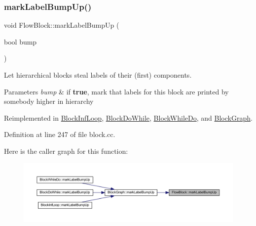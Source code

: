 \subsubsection{\texorpdfstring{markLabelBumpUp()}{markLabelBumpUp()}}
{\footnotesize\ttfamily void Flow\+Block\+::mark\+Label\+Bump\+Up (\begin{DoxyParamCaption}\item[{bool}]{bump }\end{DoxyParamCaption})\hspace{0.3cm}{\ttfamily [virtual]}}



Let hierarchical blocks steal labels of their (first) components. 


\begin{DoxyParams}{Parameters}
{\em bump} & if {\bfseries{true}}, mark that labels for this block are printed by somebody higher in hierarchy \\
\hline
\end{DoxyParams}


Reimplemented in \mbox{\hyperlink{class_block_inf_loop_a4b07279f936c69240ceacf4d5e8dfebc}{Block\+Inf\+Loop}}, \mbox{\hyperlink{class_block_do_while_ab391ccd9276eec9200396ea6e8db7a96}{Block\+Do\+While}}, \mbox{\hyperlink{class_block_while_do_ac850d56fa3365a195b91373ef00d7bd3}{Block\+While\+Do}}, and \mbox{\hyperlink{class_block_graph_a67e2a75a80e60655a9936045d40983f6}{Block\+Graph}}.



Definition at line 247 of file block.\+cc.

Here is the caller graph for this function\+:
\nopagebreak
\begin{figure}[H]
\begin{center}
\leavevmode
\includegraphics[width=350pt]{class_flow_block_a0882ce85a017e4988eda779de6a86089_icgraph}
\end{center}
\end{figure}
\mbox{\label{class_flow_block_ad06e84d3405ffe52bc29837265402d78}} 
